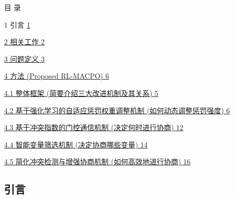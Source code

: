 \documentclass[12pt]{ctexart}
\author{}
\date{}
\begin{document}
目 录

1 引言 \hyperref[ux5f15ux8a00]{1}

\hyperref[ux76f8ux5173ux5de5ux4f5c]{2 相关工作
\hyperref[ux76f8ux5173ux5de5ux4f5c]{2}}

\hyperref[ux95eeux9898ux5b9aux4e49]{3 问题定义
\hyperref[ux95eeux9898ux5b9aux4e49]{3}}

\hyperref[ux65b9ux6cd5-proposed-rl-macpo]{4 方法 (Proposed RL-MACPO)
\hyperref[ux65b9ux6cd5-proposed-rl-macpo]{6}}

\hyperref[ux6574ux4f53ux6846ux67b6-ux7b80ux8981ux4ecbux7ecdux4e09ux5927ux6539ux8fdbux673aux5236ux53caux5176ux5173ux7cfb]{4.1
整体框架 (简要介绍三大改进机制及其关系)
\hyperref[ux6574ux4f53ux6846ux67b6-ux7b80ux8981ux4ecbux7ecdux4e09ux5927ux6539ux8fdbux673aux5236ux53caux5176ux5173ux7cfb]{5}}

\hyperref[ux57faux4e8eux5f3aux5316ux5b66ux4e60ux7684ux81eaux9002ux5e94ux60e9ux7f5aux6743ux91cdux8c03ux6574ux673aux5236-ux5982ux4f55ux52a8ux6001ux8c03ux6574ux60e9ux7f5aux5f3aux5ea6]{4.2
基于强化学习的自适应惩罚权重调整机制 (如何动态调整惩罚强度)
\hyperref[ux57faux4e8eux5f3aux5316ux5b66ux4e60ux7684ux81eaux9002ux5e94ux60e9ux7f5aux6743ux91cdux8c03ux6574ux673aux5236-ux5982ux4f55ux52a8ux6001ux8c03ux6574ux60e9ux7f5aux5f3aux5ea6]{6}}

\hyperref[ux57faux4e8eux51b2ux7a81ux6307ux6570ux7684ux95e8ux63a7ux901aux4fe1ux673aux5236-ux51b3ux5b9aux4f55ux65f6ux8fdbux884cux534fux5546]{4.3
基于冲突指数的门控通信机制 (决定何时进行协商)
\hyperref[ux57faux4e8eux51b2ux7a81ux6307ux6570ux7684ux95e8ux63a7ux901aux4fe1ux673aux5236-ux51b3ux5b9aux4f55ux65f6ux8fdbux884cux534fux5546]{12}}

\hyperref[ux667aux80fdux53d8ux91cfux7b5bux9009ux673aux5236-ux51b3ux5b9aux534fux5546ux54eaux4e9bux53d8ux91cf]{4.4
智能变量筛选机制 (决定协商哪些变量)
\hyperref[ux667aux80fdux53d8ux91cfux7b5bux9009ux673aux5236-ux51b3ux5b9aux534fux5546ux54eaux4e9bux53d8ux91cf]{14}}

\hyperref[ux7b80ux5316ux51b2ux7a81ux68c0ux6d4bux4e0eux589eux5f3aux534fux5546ux673aux5236-ux5982ux4f55ux9ad8ux6548ux5730ux8fdbux884cux534fux5546]{4.5
简化冲突检测与增强协商机制 (如何高效地进行协商)
\hyperref[ux7b80ux5316ux51b2ux7a81ux68c0ux6d4bux4e0eux589eux5f3aux534fux5546ux673aux5236-ux5982ux4f55ux9ad8ux6548ux5730ux8fdbux884cux534fux5546]{16}}

\textbf{\hfill\break
}

\subsection{引言}\label{ux5f15ux8a00}
\end{document}

